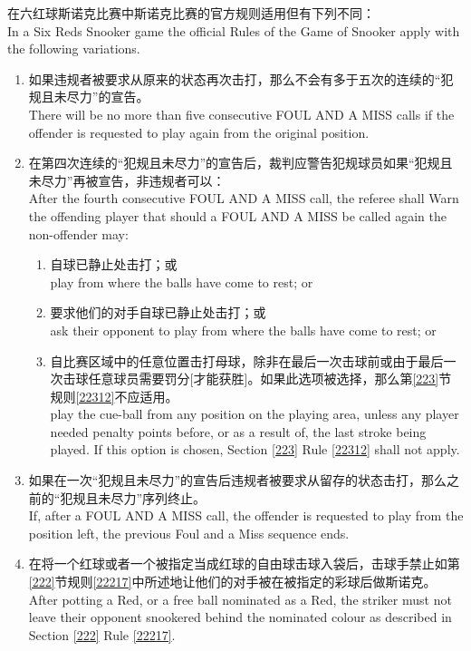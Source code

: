 \noindent 在六红球斯诺克比赛中斯诺克比赛的官方规则适用但有下列不同：\\
In a Six Reds Snooker game the official Rules of the Game of 
Snooker apply with the following variations.
\begin{enumerate}[label=(\alph*)]
    \item 如果违规者被要求从原来的状态再次击打，那么不会有多于五次的连续的``犯规且未尽力''的宣告。\\
    There will be no more than five consecutive FOUL AND A MISS calls if the offender is requested to play again from the original position.
    \item 在第四次连续的``犯规且未尽力''的宣告后，裁判应警告犯规球员如果``犯规且未尽力''再被宣告，非违规者可以：\\
    After the fourth consecutive FOUL AND A MISS call, the referee shall Warn the offending player that should a FOUL AND A MISS be called again the non-offender may:
    \begin{enumerate}[label=(\roman*)]
        \item 自球已静止处击打；或\\
        play from where the balls have come to rest; or
        \item 要求他们的对手自球已静止处击打；或\\
        ask their opponent to play from where the balls have come to rest; or
        \item 自比赛区域中的任意位置击打母球，除非在最后一次击球前或由于最后一次击球任意球员需要罚分[才能获胜]。如果此选项被选择，那么第\ref{223}节规则\ref{22312}不应适用。\\
        play the cue-ball from any position on the playing area, unless any player needed penalty points before, or as a result of, the last stroke being played. If this option is chosen, Section \ref{223} Rule \ref{22312} shall not apply.
    \end{enumerate}
    \item 如果在一次``犯规且未尽力''的宣告后违规者被要求从留存的状态击打，那么之前的``犯规且未尽力''序列终止。\\
    If, after a FOUL AND A MISS call, the offender is requested to play from the position left, the previous Foul and a Miss sequence ends.
    \item 在将一个红球或者一个被指定当成红球的自由球击球入袋后，击球手禁止如第\ref{222}节规则\ref{22217}中所述地让他们的对手被在被指定的彩球后做斯诺克。\\
    After potting a Red, or a free ball nominated as a Red, the striker must not leave their opponent snookered behind the nominated colour as described in Section \ref{222} Rule \ref{22217}.
\end{enumerate}

